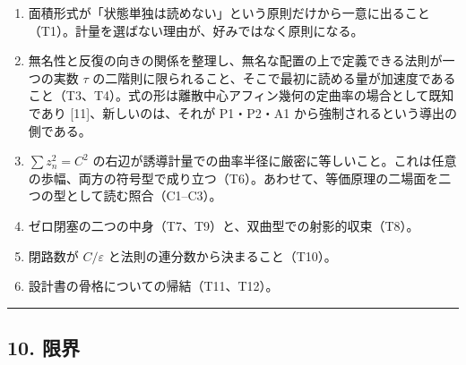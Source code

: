\documentclass[
  a4paper,
]{ltjsarticle}
\providecommand{\tightlist}{%
  \setlength{\itemsep}{0pt}\setlength{\parskip}{0pt}}
\begin{document}
\begin{enumerate}
\def\labelenumi{\arabic{enumi}.}
\tightlist
\item
  面積形式が「状態単独は読めない」という原則だけから一意に出ること（T1）。計量を選ばない理由が、好みではなく原則になる。
\item
  無名性と反復の向きの関係を整理し、無名な配置の上で定義できる法則が一つの実数
  \(\tau\)
  の二階則に限られること、そこで最初に読める量が加速度であること（T3、T4）。式の形は離散中心アフィン幾何の定曲率の場合として既知であり
  {[}11{]}、新しいのは、それが P1・P2・A1
  から強制されるという導出の側である。
\item
  \(\sum z_n^2=C^2\)
  の右辺が誘導計量での曲率半径に厳密に等しいこと。これは任意の歩幅、両方の符号型で成り立つ（T6）。あわせて、等価原理の二場面を二つの型として読む照合（C1--C3）。
\item
  ゼロ閉塞の二つの中身（T7、T9）と、双曲型での射影的収束（T8）。
\item
  閉路数が \(C/\varepsilon\) と法則の連分数から決まること（T10）。
\item
  設計書の骨格についての帰結（T11、T12）。
\end{enumerate}

\begin{center}\rule{0.5\linewidth}{0.5pt}\end{center}

\subsection{10. 限界}\label{ux9650ux754c}
\end{document}
